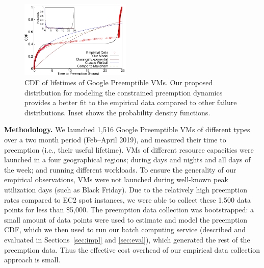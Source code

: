 
\begin{figure}
  \includegraphics[width=0.47\textwidth]{../data/gnuplot-figures/sigmetrics-fig-cdf-prob-inset-time.pdf} 
  \caption{CDF of lifetimes of Google Preemptible VMs. Our proposed distribution for modeling the constrained preemption dynamics provides a better fit to the empirical data compared to other failure distributions. Inset shows the probability density functions.}
  \label{fig:gcp1}
\end{figure}



\noindent \textbf{Methodology.} We launched  1,516 Google Preemptible VMs of different types over a two month period (Feb--April 2019), and measured their time to preemption (i.e., their useful lifetime).\footnotemark
VMs of different resource capacities were launched in a four geographical regions; during days and nights and all days of the week; and running different workloads. 
To ensure the generality of our empirical observations, VMs were not launched during well-known peak utilization days (such as Black Friday).
%
Due to the relatively high preemption rates compared to EC2 spot instances, we were able to collect these 1,500 data points for less than \$5,000. 
%
The preemption data collection was bootstrapped: a small amount of data points were used to estimate and model the preemption CDF, which we then used to run our batch computing service (described and evaluated in Sections~\ref{sec:impl} and \ref{sec:eval}), which generated the rest of the preemption data.  
%
Thus the effective cost overhead of our empirical data collection approach  is small. 

